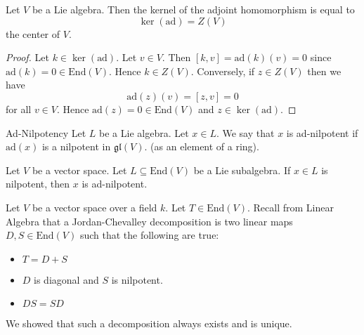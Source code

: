 \documentclass[a4paper]{article}
\begin{document}
\begin{lmm}{}{} Let $V$ be a Lie algebra. Then the kernel of the adjoint homomorphism is equal to $$\ker(\text{ad})=Z(V)$$ the center of $V$. \tcbline
\begin{proof}
Let $k\in\ker(\text{ad})$. Let $v\in V$. Then $[k,v]=\text{ad}(k)(v)=0$ since $\text{ad}(k)=0\in\text{End}(V)$. Hence $k\in Z(V)$. Conversely, if $z\in Z(V)$ then we have $$\text{ad}(z)(v)=[z,v]=0$$ for all $v\in V$. Hence $\text{ad}(z)=0\in\text{End}(V)$ and $z\in\ker(\text{ad})$. 
\end{proof}
\end{lmm}

\begin{defn}{Ad-Nilpotency}{} Let $L$ be a Lie algebra. Let $x\in L$. We say that $x$ is ad-nilpotent if $\text{ad}(x)$ is a nilpotent in $\mathfrak{gl}(V)$. (as an element of a ring). 
\end{defn}

\begin{lmm}{}{} Let $V$ be a vector space. Let $L\subseteq\text{End}(V)$ be a Lie subalgebra. If $x\in L$ is nilpotent, then $x$ is ad-nilpotent. 
\end{lmm}

Let $V$ be a vector space over a field $k$. Let $T\in\text{End}(V)$. Recall from Linear Algebra that a Jordan-Chevalley decomposition is two linear maps $D,S\in\text{End}(V)$ such that the following are true: 
\begin{itemize}
\item $T=D+S$
\item $D$ is diagonal and $S$ is nilpotent. 
\item $DS=SD$
\end{itemize}
We showed that such a decomposition always exists and is unique. 
\end{document}

